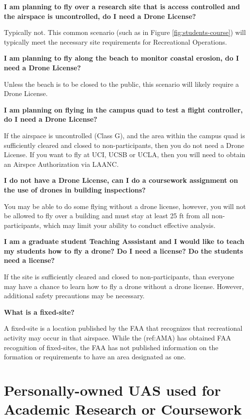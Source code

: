\documentclass[
]{book}
\begin{document}
\textbf{I am planning to fly over a research site that is access controlled and the airspace is uncontrolled, do I need a Drone License?}

Typically not. This common scenario (such as in Figure \ref{fig:students-course}) will typically meet the necessary site requirements for Recreational Operations.

\textbf{I am planning to fly along the beach to monitor coastal erosion, do I need a Drone License?}

Unless the beach is to be closed to the public, this scenario will likely require a Drone License.

\textbf{I am planning on flying in the campus quad to test a flight controller, do I need a Drone License?}

If the airspace is uncontrolled (Class G), and the area within the campus quad is sufficiently cleared and closed to non-participants, then you do not need a Drone License. If you want to fly at UCI, UCSB or UCLA, then you will need to obtain an Airspce Authorization via LAANC.

\textbf{I do not have a Drone License, can I do a coursework assignment on the use of drones in building inspections?}

You may be able to do some flying without a drone license, however, you will not be allowed to fly over a building and must stay at least 25 ft from all non-participants, which may limit your ability to conduct effective analysis.

\textbf{I am a graduate student Teaching Asssistant and I would like to teach my students how to fly a drone? Do I need a license? Do the students need a license?}

If the site is sufficiently cleared and closed to non-participants, than everyone may have a chance to learn how to fly a drone without a drone license. However, additional safety precautions may be necessary.

\textbf{What is a fixed-site?}

A fixed-site is a location published by the FAA that recognizes that recreational activity may occur in that airspace. While the (ref:AMA) has obtained FAA recognition of fixed-sites, the FAA has not published information on the formation or requirements to have an area designated as one.

\hypertarget{personally-owned-uas-used-for-academic-research-or-coursework}{%
\section{Personally-owned UAS used for Academic Research or Coursework}\label{personally-owned-uas-used-for-academic-research-or-coursework}}
\end{document}
